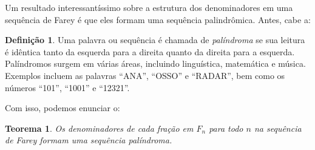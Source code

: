 \documentclass{hipatia}
\newtheorem*{theorem*}{Teorema}
\theoremstyle{definition} %
\newtheorem*{definition*}{Definição} %
\begin{document}
Um resultado interessantíssimo sobre a estrutura dos denominadores em uma sequência de Farey é que eles formam uma sequência palindrômica. Antes, cabe a:

\begin{definition*}
    Uma palavra ou sequência é chamada de \textit{palíndroma} se sua leitura é idêntica tanto da esquerda para a direita quanto da direita para a esquerda. Palíndromos surgem em várias áreas, incluindo linguística, matemática e música. Exemplos incluem as palavras ``ANA'', ``OSSO'' e ``RADAR'', bem como os números ``101'', ``1001'' e ``12321''.
\end{definition*}

Com isso, podemos enunciar o:


\begin{theorem*}
      Os denominadores de cada fração em \(F_{n}\) para todo \(n\) na sequência de Farey formam uma sequência palíndroma.
\end{theorem*}
    
\end{document}
